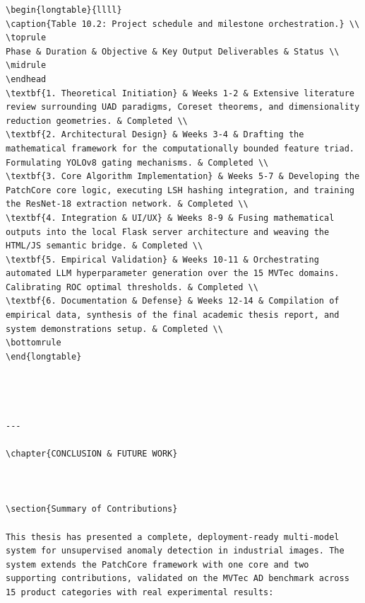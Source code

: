 \documentclass[12pt,a4paper,oneside]{report}
\begin{document}
\begin{verbatim}
\begin{longtable}{llll}
\caption{Table 10.2: Project schedule and milestone orchestration.} \\
\toprule
Phase & Duration & Objective & Key Output Deliverables & Status \\
\midrule
\endhead
\textbf{1. Theoretical Initiation} & Weeks 1-2 & Extensive literature review surrounding UAD paradigms, Coreset theorems, and dimensionality reduction geometries. & Completed \\
\textbf{2. Architectural Design} & Weeks 3-4 & Drafting the mathematical framework for the computationally bounded feature triad. Formulating YOLOv8 gating mechanisms. & Completed \\
\textbf{3. Core Algorithm Implementation} & Weeks 5-7 & Developing the PatchCore core logic, executing LSH hashing integration, and training the ResNet-18 extraction network. & Completed \\
\textbf{4. Integration & UI/UX} & Weeks 8-9 & Fusing mathematical outputs into the local Flask server architecture and weaving the HTML/JS semantic bridge. & Completed \\
\textbf{5. Empirical Validation} & Weeks 10-11 & Orchestrating automated LLM hyperparameter generation over the 15 MVTec domains. Calibrating ROC optimal thresholds. & Completed \\
\textbf{6. Documentation & Defense} & Weeks 12-14 & Compilation of empirical data, synthesis of the final academic thesis report, and system demonstrations setup. & Completed \\
\bottomrule
\end{longtable}




---

\chapter{CONCLUSION & FUTURE WORK}



\section{Summary of Contributions}

This thesis has presented a complete, deployment-ready multi-model system for unsupervised anomaly detection in industrial images. The system extends the PatchCore framework with one core and two supporting contributions, validated on the MVTec AD benchmark across 15 product categories with real experimental results:


\end{verbatim}
\end{document}
